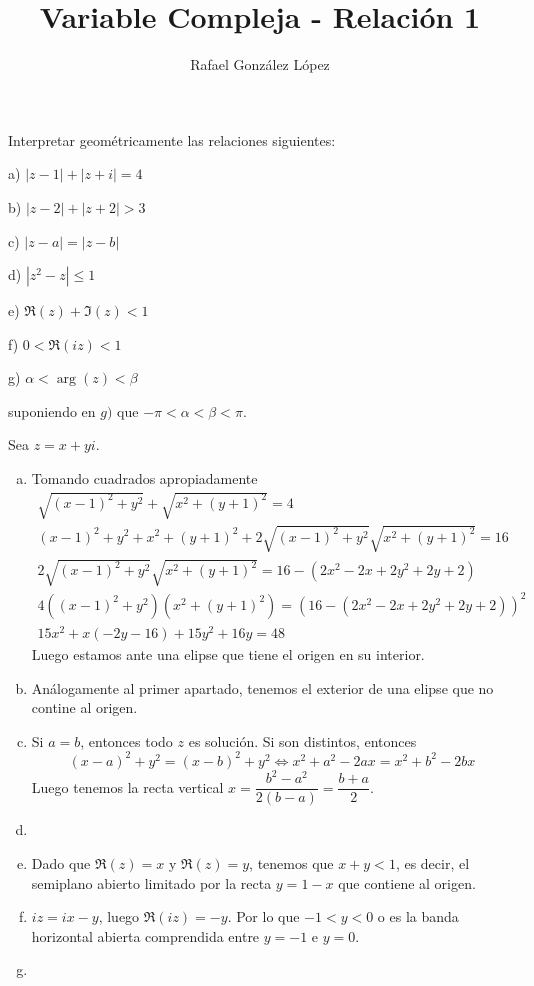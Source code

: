 \documentclass[twoside]{article}
\begin{document}
\title{Variable Compleja - Relación 1}
\author{Rafael González López}
\maketitle

\begin{ejercicio}{1}
Interpretar geométricamente las relaciones siguientes:
  \begin{AutoMultiColItemize}
  \item[a)] $|z-1|+|z+i|=4$
  \item[b)] $|z-2|+|z+2|>3$
  \item[c)] $|z-a|=|z-b|$
  \item[d)] $|z^2-z|\leq 1$
  \item[e)] $\Re(z)+\Im(z)<1$
  \item[f)] $0<\Re(iz)<1$
  \item[g)] $\alpha < \arg(z) < \beta$
  \end{AutoMultiColItemize}
suponiendo en $g)$ que $-\pi<\alpha<\beta<\pi$. 
\end{ejercicio}
\begin{solucion}
Sea $z=x+yi$. 
\begin{enumerate}[a)]
\item Tomando cuadrados apropiadamente
\begin{gather*}
\sqrt{(x-1)^2+y^2}+\sqrt{x^2+(y+1)^2}=4\\
(x-1)^2+y^2 + x^2+(y+1)^2 + 2\sqrt{(x-1)^2+y^2}\sqrt{x^2+(y+1)^2} = 16\\
2\sqrt{(x-1)^2+y^2}\sqrt{x^2+(y+1)^2} = 16 - (2 x^2 - 2 x + 2 y^2 + 2 y + 2)\\
4((x-1)^2+y^2)(x^2+(y+1)^2) = (16 - (2 x^2 - 2 x + 2 y^2 + 2 y + 2))^2\\
15 x^2 + x (-2 y - 16) + 15 y^2 + 16 y = 48	
\end{gather*}
Luego estamos ante una elipse que tiene el origen en su interior.
\item Análogamente al primer apartado, tenemos el exterior de una elipse que no contine al origen.
\item Si $a=b$, entonces todo $z$ es solución. Si son distintos, entonces
$$
(x-a)^2+y^2 = (x-b)^2 +y^2  \Leftrightarrow x^2+a^2-2ax = x^2+b^2 -2bx 
$$
Luego tenemos la recta vertical $x = \dfrac{b^2-a^2}{2(b-a)}=\dfrac{b+a}{2}$.
\item 
\item Dado que $\Re(z)=x$ y $\Re(z)=y$, tenemos que $x+y<1$, es decir, el semiplano abierto limitado por la recta $y=1-x$ que contiene al origen.
\item $iz= ix-y$, luego $\Re(iz)= -y$. Por lo que $-1<y<0$ o es la banda horizontal abierta comprendida entre $y=-1$ e $y=0$.
\item 
\end{enumerate}
\end{solucion}
\newpage
\begin{ejercicio}{2}
\end{ejercicio}
\begin{solucion}
\end{solucion}
\newpage
\end{document}
